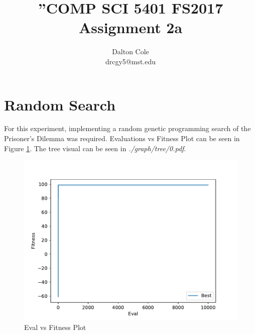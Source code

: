 \documentclass[times]{article}
\begin{document}
	\title{”COMP SCI 5401 FS2017 Assignment 2a}
	\author{Dalton Cole \\ drcgy5@mst.edu}
	\date{}
	\maketitle

	\section{Random Search}
	For this experiment, implementing a random genetic programming search of the Prisoner's Dilemma was required. Evaluations vs Fitness Plot can be seen in Figure \ref{fig:plot}. The tree visual can be seen in \textit{./graph/tree/0.pdf}.

	\begin{figure}
		\caption{Eval vs Fitness Plot}
		\label{fig:plot}
		\includegraphics[width=\textwidth]{../graph/chart/0.pdf}
	\end{figure}

		
\end{document}
